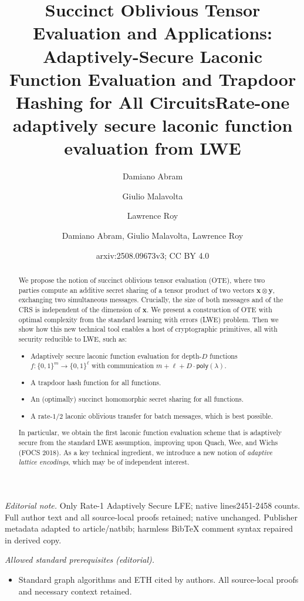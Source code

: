 \documentclass{article}
\author{Damiano Abram \and Giulio Malavolta \and Lawrence Roy}\date{}
\title{Succinct Oblivious Tensor Evaluation and Applications: Adaptively-Secure Laconic Function Evaluation and Trapdoor Hashing for All Circuits}
\title{Rate-one adaptively secure laconic function evaluation from LWE}
\author{Damiano Abram, Giulio Malavolta, Lawrence Roy}
\date{arxiv:2508.09673v3; CC BY 4.0}
\newcommand{\poly}{\mathsf{poly}}
\renewcommand{\sec}{\ensuremath{\lambda}}
\begin{document}
\maketitle
\noindent\textit{Editorial note.} Only Rate-1 Adaptively Secure LFE; native lines2451-2458 counts. Full author text and all source-local proofs retained; native unchanged. Publisher metadata adapted to article/natbib; harmless BibTeX comment syntax repaired in derived copy.\par\medskip
\noindent\textit{Allowed standard prerequisites (editorial).}\begin{itemize}
\item Standard graph algorithms and ETH cited by authors. All source-local proofs and necessary context retained.
\end{itemize}\medskip

\maketitle
\begin{abstract}
    We propose the notion of succinct oblivious tensor evaluation (OTE), where two parties compute an additive secret sharing of a tensor product of two vectors $\mathbf{x} \otimes \mathbf{y}$, exchanging two simultaneous messages. Crucially, the size of both messages and of the CRS is independent of the dimension of $\mathbf{x}$.
    We present a construction of OTE with optimal complexity from the standard learning with errors (LWE) problem. Then we show how this new technical tool enables a host of cryptographic primitives, all with security reducible to LWE, such as:
    \begin{itemize}
        \item Adaptively secure laconic function evaluation for depth-$D$ functions $f:\{0, 1\}^m\rightarrow\{0, 1\}^\ell$ with communication $m+\ell+ D\cdot\poly(\sec)$.
        \item A trapdoor hash function for all functions.
        \item An (optimally) succinct homomorphic secret sharing for all functions.
        \item A rate-$1/2$ laconic oblivious transfer for batch messages, which is best possible.
    \end{itemize}
    In particular, we obtain the first laconic function evaluation scheme that is adaptively secure from the standard LWE assumption, improving upon Quach, Wee, and Wichs (FOCS 2018). 
    As a key technical ingredient, we introduce a new notion of \emph{adaptive lattice encodings}, which may be of independent interest.
\end{abstract}
\end{document}
